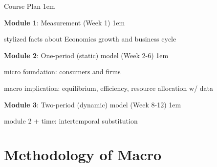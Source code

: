 \documentclass[11pt,aspectratio=43]{beamer}
\let\olditemize=\itemize
\let\endolditemize=\enditemize
\renewenvironment{itemize}{\olditemize \itemsep1em}{\endolditemize}
\theoremstyle{definition}
\begin{document}
\begin{frame}{Course Plan}
\label{slide:Course_Plan}
\begin{itemize}
    \item \textbf{Module 1}: Measurement (Week 1)
    \begin{itemize}
        \item stylized facts about Economics growth and business cycle
    \end{itemize}
    \item \textbf{Module 2}: One-period (\alert{static}) model (Week 2-6)
    \begin{itemize}
        \item micro foundation: consumers and firms
        \item macro implication: equilibrium, efficiency, resource allocation w/ data
    \end{itemize}
    \item \textbf{Module 3}: Two-period (\alert{dynamic}) model (Week 8-12)
    \begin{itemize}
        \item module 2 $ + $ time: \alert{intertemporal substitution}
    \end{itemize}
\end{itemize}
\end{frame}

\section{Methodology of Macro}
\label{sec:Methodology_of_Macro}
\end{document}
